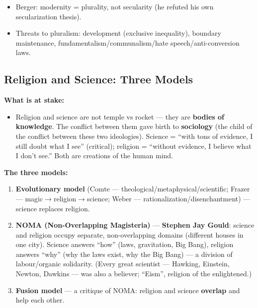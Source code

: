 \begin{QuickRevision}
\begin{itemize}
\item Berger: modernity = plurality, not secularity (he refuted his own secularization thesis).
\item Threats to pluralism: development (exclusive inequality), boundary maintenance, fundamentalism/communalism/hate speech/anti-conversion laws.
\end{itemize}
\end{QuickRevision}

\sectiondivider

\subsection{Religion and Science: Three Models}

\begin{KeyConcept}
\textbf{What is at stake:}
\begin{itemize}
\item Religion and science are not temple vs rocket --- they are \textbf{bodies of knowledge}. The conflict between them gave birth to \textbf{sociology} (the child of the conflict between these two ideologies). Science = ``with tons of evidence, I still doubt what I see'' (critical); religion = ``without evidence, I believe what I don't see.'' Both are creations of the human mind.
\end{itemize}
\end{KeyConcept}

\begin{DataFact}
\textbf{The three models:}
\begin{enumerate}
\item \textbf{Evolutionary model} (Comte --- theological/metaphysical/scientific; Frazer --- magic$\rightarrow$religion$\rightarrow$science; Weber --- rationalization/disenchantment) --- science replaces religion.
\item \textbf{NOMA (Non-Overlapping Magisteria)} --- \textbf{Stephen Jay Gould}: science and religion occupy separate, non-overlapping domains (different houses in one city). Science answers ``how'' (laws, gravitation, Big Bang), religion answers ``why'' (why the laws exist, why the Big Bang) --- a division of labour/organic solidarity. (Every great scientist --- Hawking, Einstein, Newton, Dawkins --- was also a believer; ``Eism'', religion of the enlightened.)
\item \textbf{Fusion model} --- a critique of NOMA: religion and science \textbf{overlap} and help each other.
\end{enumerate}
\end{DataFact}

